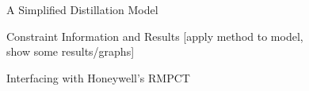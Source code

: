 \documentclass{beamer}
\begin{document}
\begin{frame}{A Simplified Distillation Model}
\end{frame}

\begin{frame}{Constraint Information and Results}
[apply method to model,\\
show some results/graphs]
\end{frame}

\begin{frame}{Interfacing with Honeywell's RMPCT}
\end{frame}
\end{document}
